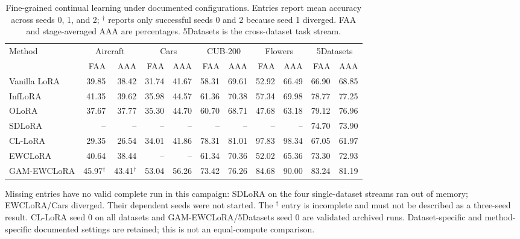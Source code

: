 \begin{table}[t]
\centering
\caption{Fine-grained continual learning under documented configurations. Entries report mean accuracy across seeds 0, 1, and 2; $^{\dagger}$ reports only successful seeds 0 and 2 because seed 1 diverged. FAA and stage-averaged AAA are percentages. 5Datasets is the cross-dataset task stream.}
\label{tab:exp_fine}
\scriptsize\setlength{\tabcolsep}{2.2pt}\renewcommand{\arraystretch}{1.08}
\begin{tabular*}{\linewidth}{@{\extracolsep{\fill}}l*{10}{r}@{}}
\toprule
Method & \multicolumn{2}{c}{Aircraft} & \multicolumn{2}{c}{Cars} & \multicolumn{2}{c}{CUB-200} & \multicolumn{2}{c}{Flowers} & \multicolumn{2}{c}{5Datasets}\\
\cmidrule(lr){2-3}\cmidrule(lr){4-5}\cmidrule(lr){6-7}\cmidrule(lr){8-9}\cmidrule(lr){10-11}
 & FAA & AAA & FAA & AAA & FAA & AAA & FAA & AAA & FAA & AAA\\\midrule
Vanilla LoRA & 39.85 & 38.42 & 31.74 & 41.67 & 58.31 & 69.61 & 52.92 & 66.49 & 66.90 & 68.85\\
InfLoRA & 41.35 & 39.62 & 35.98 & 44.57 & 61.36 & 70.38 & 57.34 & 69.98 & 78.77 & 77.25\\
OLoRA & 37.67 & 37.77 & 35.30 & 44.70 & 60.70 & 68.71 & 47.68 & 63.18 & 79.12 & 76.96\\
SDLoRA & -- & -- & -- & -- & -- & -- & -- & -- & 74.70 & 73.90\\
CL-LoRA & 29.35 & 26.54 & 34.01 & 41.86 & 78.31 & 81.01 & 97.83 & 98.34 & 67.05 & 61.97\\
EWCLoRA & 40.64 & 38.44 & -- & -- & 61.34 & 70.36 & 52.02 & 65.36 & 73.30 & 72.93\\
GAM-EWCLoRA & 45.97$^{\dagger}$ & 43.41$^{\dagger}$ & 53.04 & 56.26 & 73.42 & 76.26 & 84.68 & 90.00 & 83.24 & 81.19\\
\bottomrule
\end{tabular*}
\par\vspace{3pt}
\begin{minipage}{\linewidth}\scriptsize
Missing entries have no valid complete run in this campaign: SDLoRA on the four single-dataset streams ran out of memory; EWCLoRA/Cars diverged. Their dependent seeds were not started. The $^{\dagger}$ entry is incomplete and must not be described as a three-seed result. CL-LoRA seed 0 on all datasets and GAM-EWCLoRA/5Datasets seed 0 are validated archived runs. Dataset-specific and method-specific documented settings are retained; this is not an equal-compute comparison.
\end{minipage}
\end{table}
